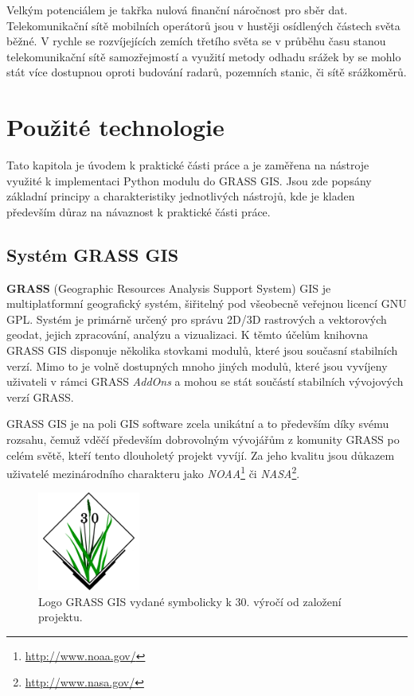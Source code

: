 \documentclass[a4paper,12pt]{report}
\begin{document}
Velkým potenciálem je takřka nulová finanční náročnost pro sběr dat. Telekomunikační sítě mobilních operátorů jsou v hustěji osídlených částech světa běžné. V rychle se rozvíjejících zemích třetího světa se v průběhu času stanou telekomunikační sítě samozřejmostí a využití metody odhadu srážek by se mohlo stát více dostupnou oproti budování radarů, pozemních stanic, či sítě srážkoměrů.
 


\setcounter{footnote}{1}







\section{Použité technologie}
Tato kapitola je úvodem k praktické části práce a je zaměřena na nástroje využité k implementaci Python modulu do GRASS GIS. Jsou zde popsány základní principy a charakteristiky jednotlivých nástrojů, kde je kladen především důraz na návaznost k praktické části práce.

\subsection{Systém GRASS GIS}
\textbf{GRASS} (Geographic Resources Analysis Support System) GIS  je multiplatformní geografický systém, šiřitelný pod všeobecně veřejnou licencí \acs{GNU GPL}. Systém je primárně určený pro správu 2D/3D rastrových a vektorových geodat, jejich zpracování, analýzu a vizualizaci. K těmto účelům knihovna GRASS GIS disponuje několika stovkami modulů, které jsou současní stabilních verzí. Mimo to je volně dostupných mnoho jiných modulů, které jsou vyvíjeny uživateli v rámci GRASS \textit{AddOns} a mohou se stát součástí stabilních vývojových verzí GRASS. 

GRASS GIS je na poli GIS software zcela unikátní a to především díky svému rozsahu, čemuž vděčí především dobrovolným vývojářům z komunity GRASS po celém světě, kteří tento dlouholetý projekt vyvíjí. Za jeho kvalitu jsou důkazem uživatelé mezinárodního charakteru jako \textit{NOAA}\footnote{\url{http://www.noaa.gov/}} či \textit{NASA}\footnote{\url{http://www.nasa.gov/}}. 

\begin{figure}[h!]
    \centering
    \includegraphics[width=0.3\textwidth]{./img/grass/grasslogo.png}
    \caption[Logo GRASS]{\centering Logo GRASS GIS vydané symbolicky k 30. výročí od založení projektu. \footnotemark }
 \end{figure}   
\end{document}
